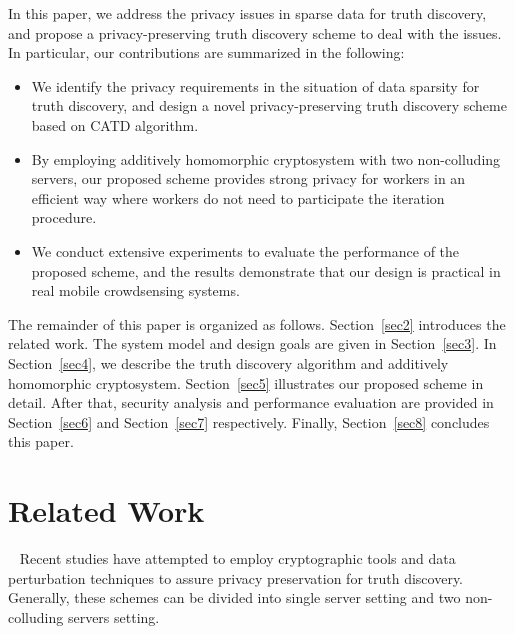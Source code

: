 \documentclass[conference]{IEEEtran}
\begin{document}
In this paper, we address the privacy issues in sparse data for truth discovery, and propose a privacy-preserving truth discovery scheme to deal with the issues.
In particular, our contributions are summarized in the following:
\begin{itemize}
  \item We identify the privacy requirements in the situation of data sparsity for truth discovery, and design a novel privacy-preserving truth discovery scheme based on CATD algorithm.
  \item By employing additively homomorphic cryptosystem with two non-colluding
servers, our proposed scheme provides strong privacy for workers in an efficient way where workers do not need to participate the iteration procedure.
  \item We conduct extensive experiments to evaluate the performance of the proposed scheme, and the results demonstrate that our design is practical in real mobile crowdsensing systems.
\end{itemize}

The remainder of this paper is organized as follows.
Section~\ref{sec2} introduces the related work.
The system model and design goals are given in Section~\ref{sec3}.
In Section~\ref{sec4}, we describe the truth discovery algorithm and additively homomorphic cryptosystem.
Section~\ref{sec5} illustrates our proposed scheme in detail.
After that, security analysis and performance evaluation are provided in Section~\ref{sec6} and Section~\ref{sec7} respectively.
Finally, Section~\ref{sec8} concludes this paper.

\section{Related Work}~\label{sec2}
Recent studies have attempted to employ cryptographic tools and data perturbation techniques to assure privacy preservation for truth discovery.
Generally, these schemes can be divided into single server setting and two non-colluding servers setting.
\end{document}
